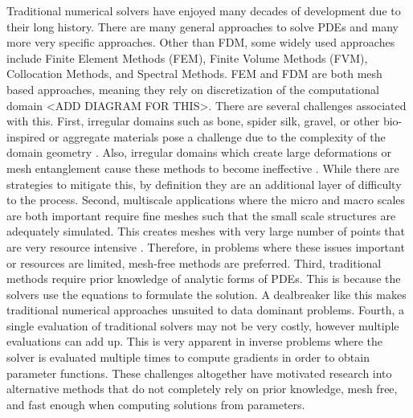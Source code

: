 Traditional numerical solvers have enjoyed many decades of development due to their long history. There are many general approaches to solve PDEs and many more very specific approaches. Other than FDM, some widely used approaches include Finite Element Methods (FEM), Finite Volume Methods (FVM), Collocation Methods, and Spectral Methods. FEM and FDM are both mesh based approaches, meaning they rely on discretization of the computational domain <ADD DIAGRAM FOR THIS>. There are several challenges associated with this. First, irregular domains such as bone, spider silk, gravel, or other bio-inspired or aggregate materials pose a challenge due to the complexity of the domain geometry \autocite{gaulSimulationWavePropagation1991,buoniEfficientScalableNumerical2007,jiaModulateStressDistribution2024}. Also, irregular domains which create large deformations or mesh entanglement cause these methods to become ineffective \autocite{chenMeshfreeMethodsProgress2017}. While there are strategies to mitigate this, by definition they are an additional layer of difficulty to the process. Second, multiscale applications where the micro and macro scales are both important require fine meshes such that the small scale structures are adequately simulated. This creates meshes with very large number of points that are very resource intensive \autocite{buoniEfficientScalableNumerical2007}. Therefore, in problems where these issues important or resources are limited, mesh-free methods are preferred. Third, traditional methods require prior knowledge of analytic forms of PDEs. This is because the solvers use the equations to formulate the solution. A dealbreaker like this makes traditional numerical approaches unsuited to data dominant problems. Fourth, a single evaluation of traditional solvers may not be very costly, however multiple evaluations can add up. This is very apparent in inverse problems where the solver is evaluated multiple times to compute gradients in order to obtain parameter functions. These challenges altogether have motivated research into alternative methods that do not completely rely on prior knowledge, mesh free, and fast enough when computing solutions from parameters.

